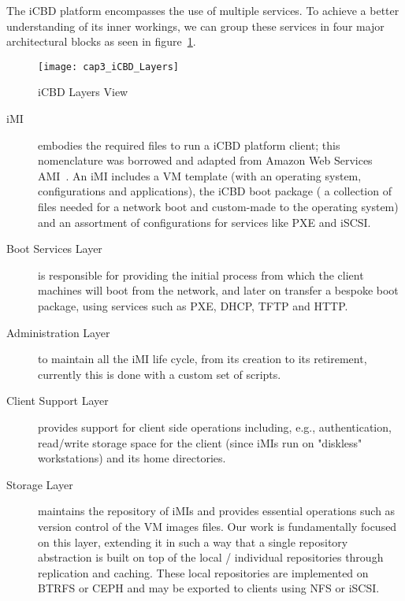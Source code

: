
The iCBD platform encompasses the use of multiple services. To achieve a better understanding of its inner workings, we can group these services in four major architectural blocks as seen in  figure~\ref{fig:icbd_layers}.


\begin{figure}[htbp]
	\centering
	\texttt{[image: cap3\_iCBD\_Layers]}
	\caption{iCBD Layers View}
	\label{fig:icbd_layers}
\end{figure}


\begin{description}
	\item [\acrfull{iMI}] embodies the required files to run a iCBD platform client; this nomenclature was borrowed and adapted from Amazon Web Services AMI~\cite{aws_ami}. An iMI includes a VM template (with an operating system, configurations and applications), the iCBD boot package ( a collection of files needed for a network boot and custom-made to the operating system) and an assortment of configurations for services like PXE and iSCSI.
	\item [Boot Services Layer] is responsible for providing the initial process from which the client machines will boot from the network, and later on transfer a bespoke boot package, using services such as \acrshort{PXE}, \acrshort{DHCP}, \acrshort{TFTP} and \acrshort{HTTP}.
	\item [Administration Layer] to maintain all the iMI life cycle, from its creation to its retirement, currently this is done with a custom set of scripts.
	\item [Client Support Layer] provides support for client side operations including, e.g., authentication, read/write storage space for the client (since iMIs run on "diskless" workstations) and its home directories. 
	\item [Storage Layer] maintains the repository of iMIs and provides essential operations such as version control of the VM images files. Our work is fundamentally focused on this layer, extending it in such a way that a single repository abstraction is built on top of the local / individual repositories through replication and caching. These local repositories are implemented on BTRFS or CEPH and may be exported to clients using \acrshort{NFS} or \acrshort{iSCSI}.
	

\end{description}
